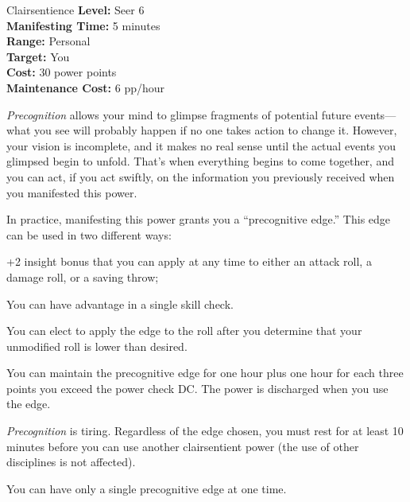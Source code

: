 {Clairsentience}
{
	\textbf{Level:}
	Seer 6\\
	\textbf{Manifesting Time:}
	5 minutes\\
	\textbf{Range:}
	Personal\\
	\textbf{Target:}
	You\\
	\textbf{Cost:}
	30 power points\\
	\textbf{Maintenance Cost:}
	6 pp/hour\\
}
{
	\emph{Precognition} allows your mind to glimpse fragments of potential future events---what you see will probably happen if no one takes action to change it. However, your vision is incomplete, and it makes no real sense until the actual events you glimpsed begin to unfold. That's when everything begins to come together, and you can act, if you act swiftly, on the information you previously received when you manifested this power.

	In practice, manifesting this power grants you a ``precognitive edge.'' This edge can be used in two different ways:
	\begin{enumerate*}
	\item +2 insight bonus that you can apply at any time to either an attack roll, a damage roll, or a saving throw;
	\item You can have advantage in a single skill check.
	\end{enumerate*}

	You can elect to apply the edge to the roll after you determine that your unmodified roll is lower than desired.

	You can maintain the precognitive edge for one hour plus one hour for each three points you exceed the power check DC. The power is discharged when you use the edge.

	\emph{Precognition} is tiring. Regardless of the edge chosen, you must rest for at least 10 minutes before you can use another clairsentient power (the use of other disciplines is not affected).

	You can have only a single precognitive edge at one time.
}